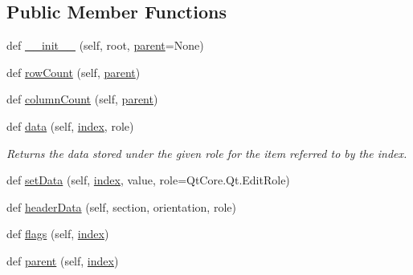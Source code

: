 \subsection*{Public Member Functions}
\begin{DoxyCompactItemize}
\item 
def \hyperlink{classdata__structure_1_1case__model_1_1_case_model_a7961b552537902b9236c2ded9cbfbc63}{\+\_\+\+\_\+init\+\_\+\+\_\+} (self, root, \hyperlink{classdata__structure_1_1case__model_1_1_case_model_afa98c784f58d15bdb49c9ba85854ae03}{parent}=None)
\item 
def \hyperlink{classdata__structure_1_1case__model_1_1_case_model_a44b390eef57be2a4883c1e6599b5a8ca}{row\+Count} (self, \hyperlink{classdata__structure_1_1case__model_1_1_case_model_afa98c784f58d15bdb49c9ba85854ae03}{parent})
\item 
def \hyperlink{classdata__structure_1_1case__model_1_1_case_model_a132b1b7d95f07cae505b40b7fdeb4545}{column\+Count} (self, \hyperlink{classdata__structure_1_1case__model_1_1_case_model_afa98c784f58d15bdb49c9ba85854ae03}{parent})
\item 
def \hyperlink{classdata__structure_1_1case__model_1_1_case_model_a2f7291849d0efb3d7cff499d1cde0bf6}{data} (self, \hyperlink{classdata__structure_1_1case__model_1_1_case_model_a3c52ee6daea1dc2ce7bb23833c761ed2}{index}, role)
\begin{DoxyCompactList}\small\item\em Returns the data stored under the given role for the item referred to by the index. \end{DoxyCompactList}\item 
def \hyperlink{classdata__structure_1_1case__model_1_1_case_model_a9d7790fb94587e15b2c1b77a01e7845c}{set\+Data} (self, \hyperlink{classdata__structure_1_1case__model_1_1_case_model_a3c52ee6daea1dc2ce7bb23833c761ed2}{index}, value, role=Qt\+Core.\+Qt.\+Edit\+Role)
\item 
def \hyperlink{classdata__structure_1_1case__model_1_1_case_model_a6a1656f6697b334ba6112c194cf04611}{header\+Data} (self, section, orientation, role)
\item 
def \hyperlink{classdata__structure_1_1case__model_1_1_case_model_ad60d9395ff571be3fcf12411886f8bcf}{flags} (self, \hyperlink{classdata__structure_1_1case__model_1_1_case_model_a3c52ee6daea1dc2ce7bb23833c761ed2}{index})
\item 
def \hyperlink{classdata__structure_1_1case__model_1_1_case_model_afa98c784f58d15bdb49c9ba85854ae03}{parent} (self, \hyperlink{classdata__structure_1_1case__model_1_1_case_model_a3c52ee6daea1dc2ce7bb23833c761ed2}{index})

\end{DoxyCompactItemize}
